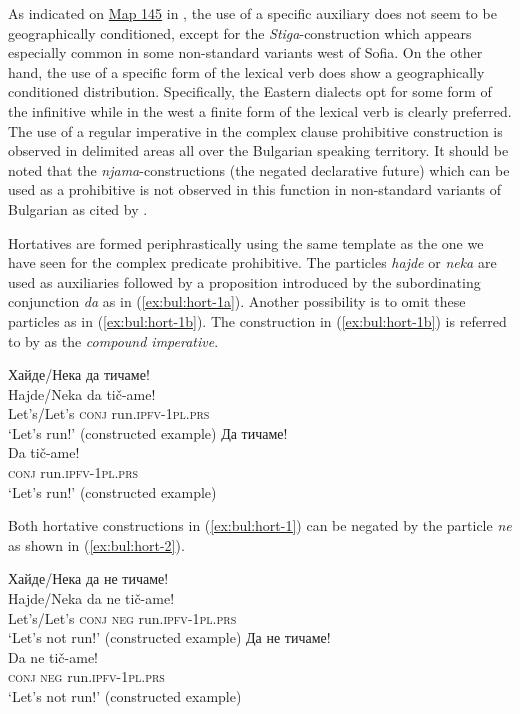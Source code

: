 \documentclass[output=paper,colorlinks=true, citecolor=brown]{langscibook}
\begin{document}
As indicated on \href{https://ibl.bas.bg/lib/bda4/#page/171/mode/1up}{Map 145} in \citet{AntonovaEtAl2016}, the use of a specific auxiliary does not seem to be geographically conditioned, except for the \textit{Stiga}-construction which appears especially common in some non-standard variants west of Sofia. On the other hand, the use of a specific form of the lexical verb does show a geographically conditioned distribution. Specifically, the Eastern dialects opt for some form of the infinitive while in the west a finite form of the lexical verb is clearly preferred. The use of a regular imperative in the complex clause prohibitive construction is observed in delimited areas all over the Bulgarian speaking territory. It should be noted that the \textit{njama}-constructions (the negated declarative future) which can be used as a prohibitive is not observed in this function in non-standard variants of Bulgarian as cited by \citet{AntonovaEtAl2016}.

Hortatives are formed periphrastically  using the same template as the one we have seen for the complex predicate prohibitive. The particles \textit{hajde} or \textit{neka} are used as auxiliaries followed by a proposition introduced by the subordinating conjunction \textit{da} as in (\ref{ex:bul:hort-1a}). Another possibility is to omit these particles as in (\ref{ex:bul:hort-1b}). The construction in (\ref{ex:bul:hort-1b}) is referred to by \citet[379]{Scatton1980} as the \textit{compound imperative}.

\ea \label{ex:bul:hort-1}
  \ea Хайде/Нека да тичаме!\label{ex:bul:hort-1a}\\ 
  	\gll Hajde/Neka da tič-ame!\\
        Let's/Let's \textsc{conj} run.\textsc{ipfv}-\textsc{1pl.prs}\\ 
    \glt `Let's run!' (constructed example)
  \ex Да тичаме!\label{ex:bul:hort-1b}\\ 
	\gll Da tič-ame!\\
        \textsc{conj} run.\textsc{ipfv}-\textsc{1pl.prs}\\
    \glt `Let's run!' (constructed example)
  \z 
\z

Both hortative constructions in (\ref{ex:bul:hort-1}) can be negated by the particle \textit{ne} as shown in (\ref{ex:bul:hort-2}). 

\ea \label{ex:bul:hort-2}
  \ea Хайде/Нека да не тичаме!\label{ex:bul:hort-2a}\\ 
  	\gll Hajde/Neka da ne tič-ame!\\
        Let's/Let's \textsc{conj} \textsc{neg} run.\textsc{ipfv}-\textsc{1pl.prs}\\ 
    \glt `Let's not run!' (constructed example)
  \ex Да не тичаме!\label{ex:bul:hort-2b}\\ 
	\gll Da ne tič-ame!\\
        \textsc{conj} \textsc{neg} run.\textsc{ipfv}-\textsc{1pl.prs}\\
    \glt `Let's not run!' (constructed example)
  \z
\z
\end{document}
